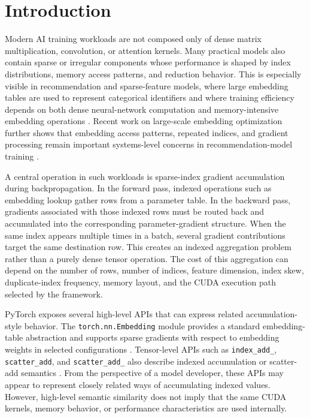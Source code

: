 \section{Introduction}

Modern AI training workloads are not composed only of dense matrix multiplication, convolution, or attention kernels. Many practical models also contain sparse or irregular components whose performance is shaped by index distributions, memory access patterns, and reduction behavior. This is especially visible in recommendation and sparse-feature models, where large embedding tables are used to represent categorical identifiers and where training efficiency depends on both dense neural-network computation and memory-intensive embedding operations \cite{gupta2020architectural,acun2021training}. Recent work on large-scale embedding optimization further shows that embedding access patterns, repeated indices, and gradient processing remain important systems-level concerns in recommendation-model training \cite{liu2024embark}.

A central operation in such workloads is sparse-index gradient accumulation during backpropagation. In the forward pass, indexed operations such as embedding lookup gather rows from a parameter table. In the backward pass, gradients associated with those indexed rows must be routed back and accumulated into the corresponding parameter-gradient structure. When the same index appears multiple times in a batch, several gradient contributions target the same destination row. This creates an indexed aggregation problem rather than a purely dense tensor operation. The cost of this aggregation can depend on the number of rows, number of indices, feature dimension, index skew, duplicate-index frequency, memory layout, and the CUDA execution path selected by the framework.

PyTorch exposes several high-level APIs that can express related accumulation-style behavior. The \texttt{torch.nn.Embedding} module provides a standard embedding-table abstraction and supports sparse gradients with respect to embedding weights in selected configurations \cite{pytorchStableEmbedding}. Tensor-level APIs such as \texttt{index\_add\_}, \texttt{scatter\_add}, and \texttt{scatter\_add\_} also describe indexed accumulation or scatter-add semantics \cite{pytorchStableIndexAdd,pytorchStableScatterAdd,pytorchStableTensorScatterAdd}. From the perspective of a model developer, these APIs may appear to represent closely related ways of accumulating indexed values. However, high-level semantic similarity does not imply that the same CUDA kernels, memory behavior, or performance characteristics are used internally.

